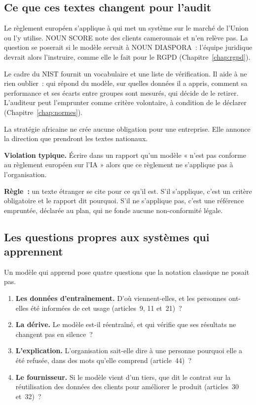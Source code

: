 \subsection{Ce que ces textes changent pour l'audit}

Le règlement européen s'applique à qui met un système sur le marché de
l'Union ou l'y utilise. NOUN SCORE note des clients camerounais et n'en
relève pas. La question se poserait si le modèle servait à NOUN
DIASPORA~: l'équipe juridique devrait alors l'instruire, comme elle le
fait pour le RGPD (Chapitre~\ref{chap:rgpd}).

Le cadre du NIST fournit un vocabulaire et une liste de vérification. Il
aide à ne rien oublier~: qui répond du modèle, sur quelles données il a
appris, comment sa performance et ses écarts entre groupes sont mesurés,
qui décide de le retirer. L'auditeur peut l'emprunter comme critère
volontaire, à condition de le déclarer (Chapitre~\ref{chap:normes}).

La stratégie africaine ne crée aucune obligation pour une entreprise.
Elle annonce la direction que prendront les textes nationaux.

\begin{boxalert}
\textbf{Violation typique.} Écrire dans un rapport qu'un modèle « n'est
pas conforme au règlement européen sur l'IA » alors que ce règlement ne
s'applique pas à l'organisation.

\smallskip
\textbf{Règle~:} un texte étranger se cite pour ce qu'il est. S'il
s'applique, c'est un critère obligatoire et le rapport dit pourquoi.
S'il ne s'applique pas, c'est une référence empruntée, déclarée au plan,
qui ne fonde aucune non-conformité légale.
\end{boxalert}

\subsection{Les questions propres aux systèmes qui apprennent}

Un modèle qui apprend pose quatre questions que la notation classique ne
posait pas.

\begin{enumerate}
    \item \textbf{Les données d'entraînement.} D'où viennent-elles, et les
          personnes ont-elles été informées de cet usage (articles~9, 11
          et~21)~?
    \item \textbf{La dérive.} Le modèle est-il réentraîné, et qui vérifie
          que ses résultats ne changent pas en silence~?
    \item \textbf{L'explication.} L'organisation sait-elle dire à une
          personne pourquoi elle a été refusée, dans des mots qu'elle
          comprend (article~44)~?
    \item \textbf{Le fournisseur.} Si le modèle vient d'un tiers, que dit
          le contrat sur la réutilisation des données des clients pour
          améliorer le produit (articles~30 et~32)~?
\end{enumerate}

